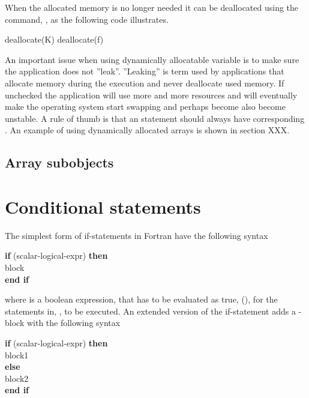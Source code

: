 When the allocated memory is no longer needed it can be deallocated using the command, , as the following code illustrates.

\begin{fortrancodeenv}
deallocate(K)
deallocate(f)
\end{fortrancodeenv}

An important issue when using dynamically allocatable variable is to make sure the application does not ''leak''. ''Leaking'' is term used by applications that allocate memory during the execution and never deallocate used memory. If unchecked the application will use more and more resources and will eventually make the operating system start swapping and perhaps become also become unstable. A rule of thumb is that an
 statement should always have corresponding . An example of using dynamically allocated arrays is shown in section XXX.

\subsection{Array subobjects}

\section{Conditional statements}

The simplest form of if-statements in Fortran have the following syntax

\begin{fsyntax}
\textbf{if} (scalar-logical-expr) \textbf{then}\\
\ftab  block\\
\textbf{end if}\\
\end{fsyntax}

where  is a boolean expression, that has to be evaluated as true, (), for the statements in, , to be executed. An extended version of the if-statement adds a -block with the following syntax

\begin{fsyntax}
\textbf{if} (scalar-logical-expr) \textbf{then}\\
\ftab block1\\
\textbf{else}\\
\ftab block2\\
\textbf{end if}\\
\end{fsyntax}

